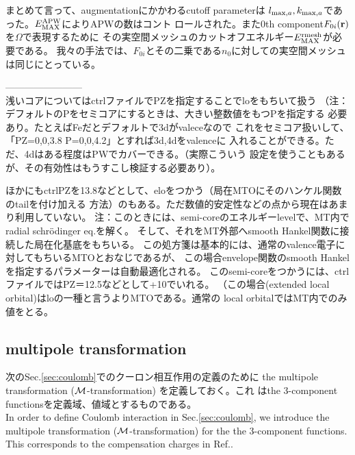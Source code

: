 \documentclass[twocolumn,showpacs,preprintnumbers,amsmath,amssymb,floatfix]{revtex4-1}
\newcommand{\bfr}{{\bf r}}
\def\EMAX{  E^{\rm APW}_{\rm MAX} }
\def\EMAXm{ E^{\rm rmesh}_{\rm MAX} }
\def\EMAX{  E^{\rm APW}_{\rm MAX} }
\def\EMAXm{ E^{\rm rmesh}_{\rm MAX} }
\def\MM{{\cal M}}
\begin{document}
まとめて言って、augmentationにかかわるcutoff parameterは
$l_{{\rm max},a},k_{{\rm max},a}$であった。$\EMAX$によりAPWの数はコント
ロールされた。また0th component$F_{0i}(\bfr)$ を$\Omega$で表現するために
その実空間メッシュのカットオフエネルギー$\EMAXm$が必要である。
我々の手法では、$F_{0i}$とその二乗である$n_0$に対しての実空間メッシュは同じにとっている。



------------------------\\
浅いコアについてはctrlファイルでPZを指定することでloをもちいて扱う
（注：デフォルトのPをセミコアにするときは、大きい整数値をもつPを指定する
必要あり。たとえばFeだとデフォルトで3dがvaleceなので
これをセミコア扱いして、「PZ=0,0,3.8 P=0,0,4.2」とすれば3d,4dをvalenceに
入れることができる。ただ、4dはある程度はPWでカバーできる。（実際こういう
設定を使うこともあるが、その有効性はもうすこし検証する必要あり）。

{\small 
ほかにもctrlPZを13.8などとして、eloをつかう（局在MTOにそのハンケル関数のtailを付け加える
方法）のもある。ただ数値的安定性などの点から現在はあまり利用していない。
注：このときには、semi-coreのエネルギーlevelで、MT内でradial schr\"odinger eq.を解く。
そして、それをMT外部へsmooth Hankel関数に接続した局在化基底をもちいる。
この処方箋は基本的には、通常のvalence電子に対してもちいるMTOとおなじであるが、
この場合envelope関数のsmooth Hankelを指定するパラメーターは自動最適化される。
このsemi-coreをつかうには、ctrlファイルではPZ＝12.5などとして+10でいれる。
（この場合(extended local orbital)はloの一種と言うよりMTOである。通常の
local orbitalではMT内でのみ値をとる。}


\subsection{multipole transformation}
\label{sec:multi} 
次のSec.\ref{sec:coulomb}でのクーロン相互作用の定義のために
the multipole transformation ($\MM$-transformation) を定義しておく。これ
はthe 3-component functionsを定義域、値域とするものである。\\
In order to define Coulomb interaction in
Sec.\ref{sec:coulomb}, we introduce the multipole transformation
($\MM$-transformation) for the the 3-component functions.  This
corresponds to the compensation charges in Ref.\cite{PAW}.
\end{document}
